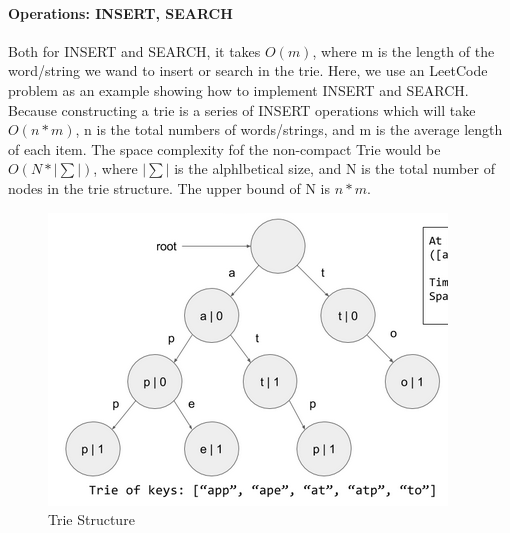 \documentclass[data-structure.tex]{subfiles}
\begin{document}
\paragraph{Operations: INSERT, SEARCH}
Both for INSERT and SEARCH, it takes $O(m)$, where m is the length of the word/string we wand to insert or search in the trie. Here, we use an LeetCode problem as an example showing how to implement INSERT and SEARCH. Because constructing a trie is a series of INSERT operations which will take $O(n*m)$, n is the total numbers of words/strings, and m is the average length of each item. The space complexity fof the non-compact Trie would be $O(N*|\sum|)$, where $|\sum|$ is the alphlbetical size, and N is the total number of nodes in the trie structure. The upper bound of N is $n*m$. 
\begin{figure}[h]
    \centering
    \includegraphics[width=0.6\columnwidth]{fig/Trie.png}
    \caption{Trie Structure}
    \label{fig:trie}
\end{figure}
\end{document}
